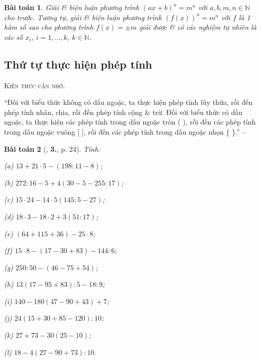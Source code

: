 \documentclass{article}
\numberwithin{equation}{section}
\newtheorem{baitoan}{Bài toán}[section]
\begin{document}
\begin{baitoan}
	Giải \& biện luận phương trình $(ax + b)^n = m^n$ với $a,b,m,n\in\mathbb{N}$ cho trước. Tương tự, giải \& biện luận phương trình $(f(x))^n = m^n$ với $f$ là 1 hàm số sao cho phương trình $f(x) = \pm m$ giải được \& có các nghiệm tự nhiên là các số $x_i$, $i = 1,\ldots,k$, $k\in\mathbb{N}$.
\end{baitoan}

\subsection{Thứ tự thực hiện phép tính}
\textsc{Kiến thức cần nhớ.}
\begin{tcolorbox}
	``Đối với biểu thức không có dấu ngoặc, ta thực hiện phép tính lũy thừa, rồi đến phép tính nhân, chia, rồi đến phép tính cộng \& trừ. Đối với biểu thức có dấu ngoặc, ta thực hiện các phép tính trong dấu ngoặc tròn ( ), rồi đến các phép tính trong dấu ngoặc vuông [ ], rồi đến các phép tính trong dấu ngoặc nhọn \{ \}.'' -- \cite[p. 24]{Trong_Toan_6_2021}
\end{tcolorbox}

\begin{baitoan}[\cite{Trong_Toan_6_2021}, \textbf{3.}, p. 24]
	Tính:
	\begin{enumerate*}
		\item[(a)] $13 + 21\cdot 5 - (198:11 - 8)$;
		\item[(b)] $272:16 - 5 + 4(30 - 5 - 255:17)$;
		\item[(c)] $15\cdot 24 - 14\cdot 5(145:5 - 27)$;
		\item[(d)] $18\cdot 3 - 18\cdot 2 + 3(51:17)$;
		\item[(e)] $(64 + 115 + 36) - 25\cdot 8$;
		\item[(f)] $15\cdot 8 - (17 - 30 + 83) - 144:6$;
		\item[(g)] $250:50 - (46 - 75 + 54)$;
		\item[(h)] $13(17 - 95 + 83):5 - 18:9$;
		\item[(i)] $140 - 180(47 - 90 + 43) + 7$;
		\item[(j)] $24(15 + 30 + 85 - 120):10$;
		\item[(k)] $27 + 73 - 30(25 - 10)$;
		\item[(l)] $18 - 4(27 - 90 + 73):10$.
	\end{enumerate*}
\end{baitoan}
\end{document}
